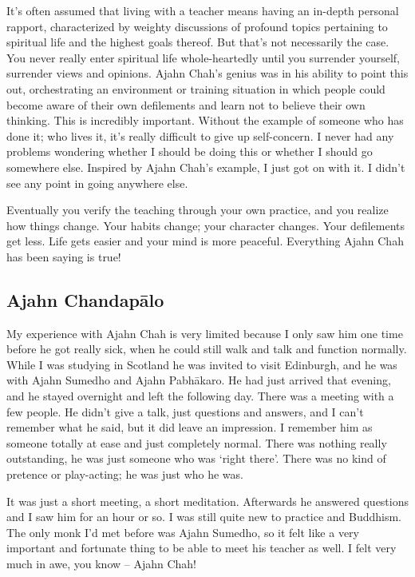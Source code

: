It's often assumed that living with a teacher means having an in-depth
personal rapport, characterized by weighty discussions of profound
topics pertaining to spiritual life and the highest goals thereof. But
that's not necessarily the case. You never really enter spiritual life
whole-heartedly until you surrender yourself, surrender views and
opinions. Ajahn Chah's genius was in his ability to point this out,
orchestrating an environment or training situation in which people could
become aware of their own defilements and learn not to believe their own
thinking. This is incredibly important. Without the example of someone
who has done it; who lives it, it's really difficult to give up
self-concern. I never had any problems wondering whether I should be
doing this or whether I should go somewhere else. Inspired by Ajahn
Chah's example, I just got on with it. I didn't see any point in going
anywhere else.

Eventually you verify the teaching through your own practice, and you
realize how things change. Your habits change; your character changes.
Your defilements get less. Life gets easier and your mind is more
peaceful. Everything Ajahn Chah has been saying is true!

\subsection{Ajahn Chandapālo}

My experience with Ajahn Chah is very limited because I only saw him one
time before he got really sick, when he could still walk and talk and
function normally. While I was studying in Scotland he was invited to
visit Edinburgh, and he was with Ajahn Sumedho and Ajahn Pabhākaro. He
had just arrived that evening, and he stayed overnight and left the
following day. There was a meeting with a few people. He didn't give a
talk, just questions and answers, and I can't remember what he said, but
it did leave an impression. I remember him as someone totally at ease
and just completely normal. There was nothing really outstanding, he was
just someone who was `right there'. There was no kind of pretence or
play-acting; he was just who he was.

It was just a short meeting, a short meditation. Afterwards he answered
questions and I saw him for an hour or so. I was still quite new to
practice and Buddhism. The only monk I'd met before was Ajahn Sumedho,
so it felt like a very important and fortunate thing to be able to meet
his teacher as well. I felt very much in awe, you know -- Ajahn Chah!

